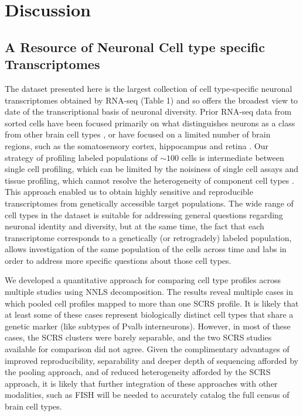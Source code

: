 
\section{Discussion}

\subsection{A Resource of Neuronal Cell type specific Transcriptomes}
The dataset presented here is the largest collection of cell type-specific neuronal transcriptomes obtained by RNA-seq (Table 1) and so offers the broadest view to date of the transcriptional basis of neuronal diversity. Prior RNA-seq data from sorted cells have been focused primarily on what distinguishes neurons as a class from other brain cell types \citep{Zhang_2014}, or have focused on a limited number of brain regions, such as the somatosensory cortex, hippocampus  \citep{Zeisel_2015,Cembrowski_2016,Tasic_2016} and retina \citep{Macosko_2015}. Our strategy of profiling labeled populations of $\sim100$ cells is intermediate between single cell profiling, which can be limited by the noisiness of single cell assays \citep{Marinov_2013} and tissue profiling, which cannot resolve the heterogeneity of component cell types \citep{Nelson_2006}. This approach enabled us to obtain highly sensitive and reproducible transcriptomes from genetically accessible target populations. The wide range of cell types in the dataset is suitable for addressing general questions regarding neuronal identity and diversity, but at the same time, the fact that each transcriptome corresponds to a genetically (or retrogradely) labeled population, allows investigation of the same population of the cells across time and labs in order to address more specific questions about those cell types.

We developed a quantitative approach for comparing cell type profiles across multiple studies using NNLS decomposition. The results reveal multiple cases in which pooled cell profiles mapped to more than one SCRS profile. It is likely that at least some of these cases represent biologically distinct cell types that share a genetic marker (like subtypes of Pvalb interneurons). However, in most of these cases, the SCRS clusters were barely separable, and the two SCRS studies available for comparison did not agree. Given the complimentary advantages of improved reproducibility, separability and deeper depth of sequencing afforded by the pooling approach, and of reduced heterogeneity afforded by the SCRS approach, it is likely that further integration of these approaches with other modalities, such as FISH \citep{Moffitt_2016} will be needed to accurately catalog the full census of brain cell types. 

